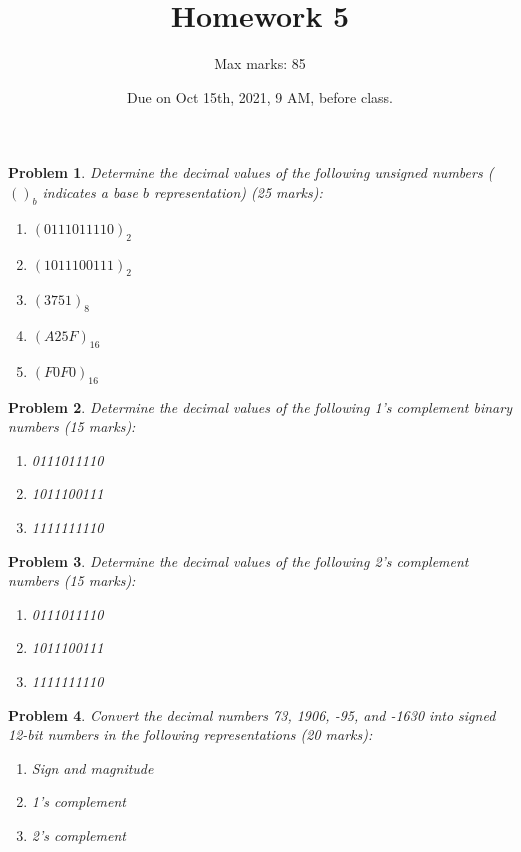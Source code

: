 \documentclass[twocolumn]{article}
\title{Homework 5}
\author{Max marks: 85}
\date{Due on Oct 15th, 2021, 9 AM, before class.}
\newtheorem{prob}{Problem}
\begin{document}
\maketitle
\begin{prob}
  Determine the decimal values of the following unsigned numbers ($()_b$
  indicates a base $b$ representation) (25 marks):
  \begin{enumerate}
  \item $(0111011110)_2$
  \item $(1011100111)_2$
  \item $(3751)_8$
  \item $(A25F)_{16}$
  \item $(F0F0)_{16}$
  \end{enumerate}
\end{prob}

\begin{prob}
  Determine the decimal values of the following 1’s complement binary numbers
  (15 marks):
  \begin{enumerate}
  \item 0111011110
  \item 1011100111
  \item 1111111110
  \end{enumerate}
\end{prob}

\begin{prob}
  Determine the decimal values of the following 2’s complement numbers (15 marks):
  \begin{enumerate}
  \item 0111011110
  \item 1011100111
  \item 1111111110
  \end{enumerate}
\end{prob}

\begin{prob}
  Convert the decimal numbers 73, 1906, -95, and -1630 into signed 12-bit numbers in the
  following representations (20 marks):
  \begin{enumerate}
    \item Sign and magnitude
    \item 1’s complement
    \item 2’s complement
  \end{enumerate}
\end{prob}
\end{document}
